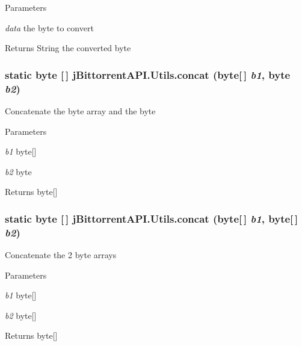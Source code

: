 \begin{DoxyParams}{Parameters}
\item[{\em data}]the byte to convert \end{DoxyParams}
\begin{DoxyReturn}{Returns}
String the converted byte 
\end{DoxyReturn}
\hypertarget{classj_bittorrent_a_p_i_1_1_utils_a3d0e19739caba5327615181ca58c3935}{
\subsubsection[{concat}]{\setlength{\rightskip}{0pt plus 5cm}static byte \mbox{[}$\,$\mbox{]} jBittorrentAPI.Utils.concat (byte\mbox{[}$\,$\mbox{]} {\em b1}, \/  byte {\em b2})}}
\label{classj_bittorrent_a_p_i_1_1_utils_a3d0e19739caba5327615181ca58c3935}
Concatenate the byte array and the byte 
\begin{DoxyParams}{Parameters}
\item[{\em b1}]byte\mbox{[}\mbox{]} \item[{\em b2}]byte \end{DoxyParams}
\begin{DoxyReturn}{Returns}
byte\mbox{[}\mbox{]} 
\end{DoxyReturn}
\hypertarget{classj_bittorrent_a_p_i_1_1_utils_ad7376ac993610cb4518149ededfdc708}{
\subsubsection[{concat}]{\setlength{\rightskip}{0pt plus 5cm}static byte \mbox{[}$\,$\mbox{]} jBittorrentAPI.Utils.concat (byte\mbox{[}$\,$\mbox{]} {\em b1}, \/  byte\mbox{[}$\,$\mbox{]} {\em b2})}}
\label{classj_bittorrent_a_p_i_1_1_utils_ad7376ac993610cb4518149ededfdc708}
Concatenate the 2 byte arrays 
\begin{DoxyParams}{Parameters}
\item[{\em b1}]byte\mbox{[}\mbox{]} \item[{\em b2}]byte\mbox{[}\mbox{]} \end{DoxyParams}
\begin{DoxyReturn}{Returns}
byte\mbox{[}\mbox{]} 
\end{DoxyReturn}
